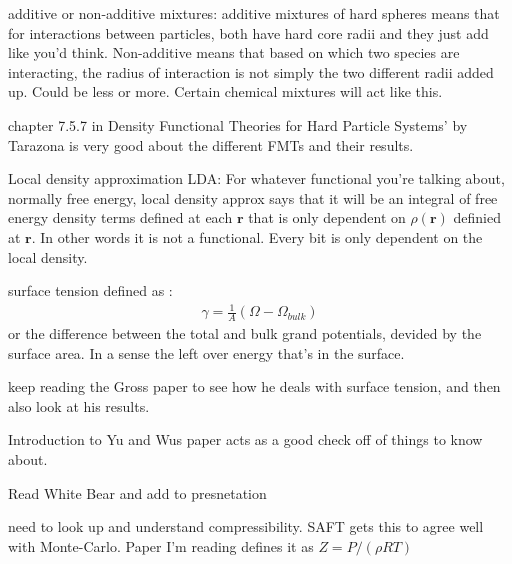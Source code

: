 \documentclass[pdftex,10pt,a4paper]{article}
\begin{document}
additive or non-additive mixtures:  additive mixtures of hard spheres means that for interactions between particles, both have hard core radii and they just add like you'd think.  Non-additive means that based on which two species are interacting, the radius of interaction is not simply the two different radii added up.  Could be less or more.  Certain chemical mixtures will act like this.

chapter 7.5.7 in Density Functional Theories for Hard Particle Systems' by Tarazona is very good about the different FMTs and their results.

Local density approximation LDA:  For whatever functional you're talking about, normally free energy, local density approx says that it will be an integral of free energy density terms defined at each $\mathbf{r}$ that is only dependent on $\rho(\mathbf{r})$ definied at $\mathbf{r}$.  In other words it is not a functional.  Every bit is only dependent on the local density.

surface tension defined as :
\begin{align}
\gamma=\frac{1}{A}(\Omega-\Omega_{bulk})
\end{align}
or the difference between the total and bulk grand potentials, devided by the surface area.  In a sense the left over energy that's in the surface.

keep reading the Gross paper to see how he deals with surface tension, and then also look at his results.

Introduction to Yu and Wus paper acts as a good check off of things to know about.


Read White Bear and add to presnetation

need to look up and understand compressibility.  SAFT gets this to agree well with Monte-Carlo.
Paper I'm reading defines it as $Z=P/(\rho RT)$
\end{document}
